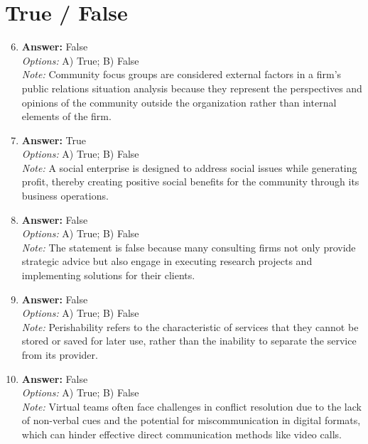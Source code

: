 \documentclass[12pt]{article}
\begin{document}
\section*{True / False}
\begin{enumerate}[label=\arabic*.]
\setcounter{enumi}{5}
\item \textbf{Answer:} False
\\ \textit{Options:} A) True; B) False
\\ \textit{Note:} Community focus groups are considered external factors in a firm's public relations situation analysis because they represent the perspectives and opinions of the community outside the organization rather than internal elements of the firm.
\item \textbf{Answer:} True
\\ \textit{Options:} A) True; B) False
\\ \textit{Note:} A social enterprise is designed to address social issues while generating profit, thereby creating positive social benefits for the community through its business operations.
\item \textbf{Answer:} False
\\ \textit{Options:} A) True; B) False
\\ \textit{Note:} The statement is false because many consulting firms not only provide strategic advice but also engage in executing research projects and implementing solutions for their clients.
\item \textbf{Answer:} False
\\ \textit{Options:} A) True; B) False
\\ \textit{Note:} Perishability refers to the characteristic of services that they cannot be stored or saved for later use, rather than the inability to separate the service from its provider.
\item \textbf{Answer:} False
\\ \textit{Options:} A) True; B) False
\\ \textit{Note:} Virtual teams often face challenges in conflict resolution due to the lack of non-verbal cues and the potential for miscommunication in digital formats, which can hinder effective direct communication methods like video calls.
\end{enumerate}
\end{document}
